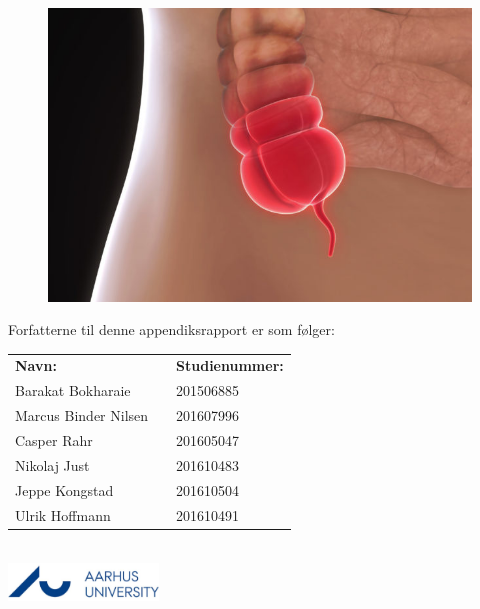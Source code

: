 \documentclass[../Hovedrapport.tex]{subfiles}
\begin{document}
    \begin{minipage}{1\textwidth}	
    \begin{figure}[H]
			\centering
			\includegraphics[width=0.6\linewidth]{Billeder/apndx.jpg}
			\label{fig:Forsidebillede}
		\end{figure}
Forfatterne til denne appendiksrapport er som følger:
\begin{table}[H]
	\begin{tabular}{lll}
	\textbf{Navn:}          & &   \textbf{Studienummer:}      \\
	Barakat Bokharaie       & &   201506885                   \\
	Marcus Binder Nilsen    & &   201607996                   \\
	Casper Rahr             & &   201605047                   \\
	Nikolaj Just            & &   201610483                   \\
	Jeppe Kongstad          & &   201610504                   \\
	Ulrik Hoffmann          & &   201610491                   \\
	\end{tabular}
\end{table}
    \end{minipage} \\
    	\includegraphics[width=0.3\textwidth]{Billeder/AUlogo.JPG}
    \vfil
\end{document}
